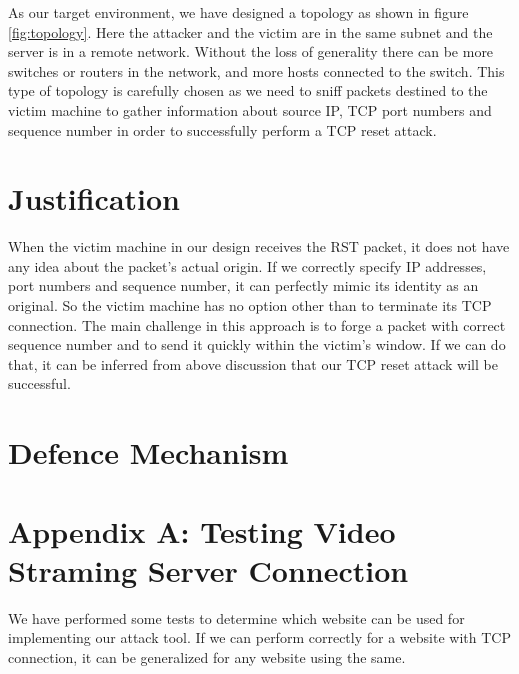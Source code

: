 \documentclass[14pt]{extarticle}
\begin{document}
     As our target environment, we have designed a topology as shown in figure \ref{fig:topology}. Here the attacker and the victim are in the same subnet and the server is in a remote network. Without the loss of generality there can be more switches or routers in the network, and more hosts connected to the switch. This type of topology is carefully chosen as we need to sniff packets destined to the victim machine to gather information about source IP, TCP port numbers and sequence number in order to successfully perform a TCP reset attack.

   


\section{Justification}
    When the victim machine in our design receives the RST packet, it does not have any idea about the packet's actual origin. If we correctly specify IP addresses, port numbers and sequence number, it can perfectly mimic its identity as an original. So the victim machine has no option other than to terminate its TCP connection. The main challenge in this approach is to forge a packet with correct sequence number and to send it quickly within the victim's window. If we can do that, it can be inferred from above discussion that our TCP reset attack will be successful.

\section{Defence Mechanism}

\section{Appendix A: Testing Video Straming Server Connection}
    \label{apx:test_server}
    We have performed some tests to determine which website can be used for implementing our attack tool. If we can perform correctly for a website with TCP connection, it can be generalized for any website using the same.
    
\end{document}

